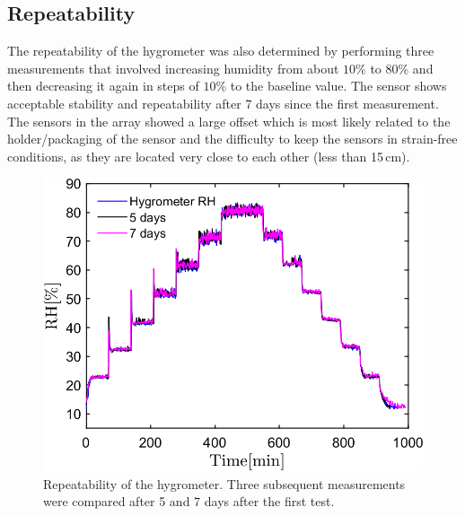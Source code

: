\subsection{Repeatability}
The repeatability of the hygrometer was also determined by performing three measurements that involved increasing humidity from about $10$\% to $80$\% and then decreasing it again in steps of $10$\% to the baseline value. The sensor shows acceptable stability and repeatability after 7 days since the first measurement. The sensors in the array showed a large offset which is most likely related to the holder/packaging of the sensor and the difficulty to keep the sensors in strain-free conditions, as they are located very close to each other (less than 15\,cm).
\begin{figure}[!h]
\centering
\includegraphics[width=0.6\columnwidth]{Chapter5/images/repeat.png}
\caption{Repeatability of the hygrometer. Three subsequent measurements were compared after 5 and 7 days after the first test.}
\label{fig_repeatability}
\end{figure}





